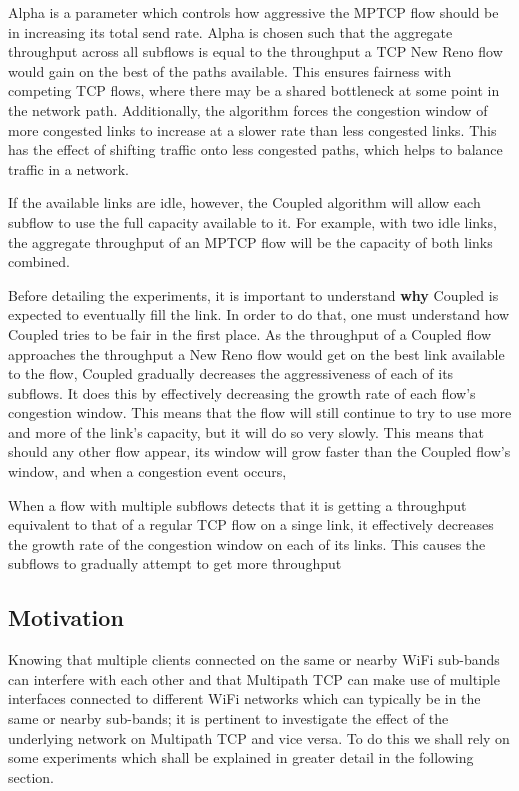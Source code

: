 Alpha is a parameter which controls how aggressive the MPTCP flow should be in
increasing its total send rate. Alpha is chosen such that the aggregate
throughput across all subflows is equal to the throughput a TCP New Reno flow
would gain on the best of the paths available. This ensures fairness with
competing TCP flows, where there may be a shared bottleneck at some point in the
network path. Additionally, the algorithm forces the congestion window of more
congested links to increase at a slower rate than less congested links. This has
the effect of shifting traffic  onto less congested paths, which helps to
balance traffic in a network.

If the available links are idle, however, the Coupled algorithm will allow each
subflow to use the full capacity available to it. For example, with two idle
links, the aggregate throughput of an MPTCP flow will be the capacity of both
links combined.


Before detailing the experiments, it is important to understand \textbf{why}
Coupled is expected to eventually fill the link. In order to do that, one must
understand how Coupled tries to be fair in the first place. As the throughput of
a Coupled flow approaches the throughput a New Reno flow would get on the best
link available to the flow, Coupled gradually decreases the aggressiveness of
each of its subflows. It does this by effectively decreasing the growth rate of
each flow's congestion window. This means that the flow will still continue to
try to use more and more of the link's capacity, but it will do so very slowly.
This means that should any other flow appear, its window will grow faster than
the Coupled flow's window, and when a congestion event occurs, %

When a flow with
multiple subflows detects that it is getting a throughput equivalent to that of
a regular TCP flow on a singe link, it effectively decreases the growth rate of
the congestion window on each of its links. This causes the subflows to
gradually attempt to get more throughput 

\subsection{Motivation}
Knowing that multiple clients connected on the same or nearby WiFi sub-bands 
can interfere with each other and that Multipath TCP can make use of multiple 
interfaces connected to different WiFi networks which can typically be in the 
same or nearby sub-bands; it is pertinent to investigate the effect of the 
underlying network on Multipath TCP and vice versa. To do this we shall rely on 
some experiments which shall be explained in greater detail in the following 
section.


